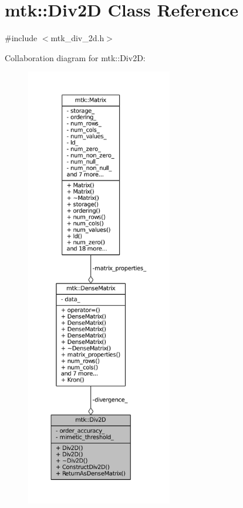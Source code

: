\hypertarget{classmtk_1_1Div2D}{\section{mtk\-:\-:Div2\-D Class Reference}
\label{classmtk_1_1Div2D}
}


{\ttfamily \#include $<$mtk\-\_\-div\-\_\-2d.\-h$>$}



Collaboration diagram for mtk\-:\-:Div2\-D\-:
\nopagebreak
\begin{figure}[H]
\begin{center}
\leavevmode
\includegraphics[height=550pt]{classmtk_1_1Div2D__coll__graph}
\end{center}
\end{figure}
